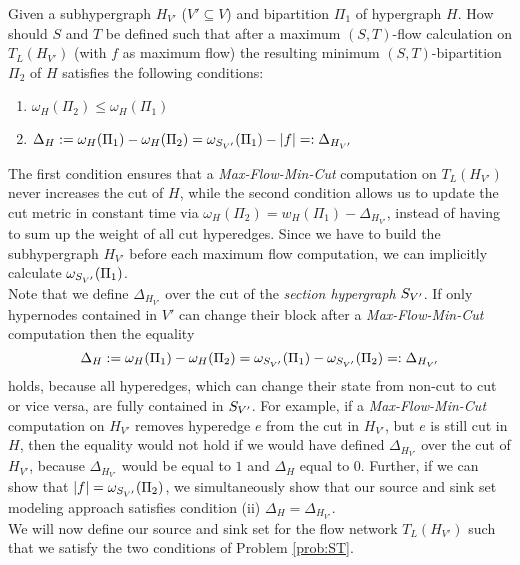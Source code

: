 \begin{problem}
\label{prob:ST} 
Given a subhypergraph $H_{V'}$ ($V' \subseteq V$) and bipartition $\Pi_1$ of hypergraph $H$.
How should $S$ and $T$ be defined such that after a maximum $(S,T)$-flow calculation on $T_L(H_{V'})$ (with 
$f$ as maximum flow) the resulting minimum $(S,T)$-bipartition $\Pi_2$ of $H$ satisfies
the following conditions:
\begin{enumerate}
\item $\omega_H(\Pi_2) \le \omega_H(\Pi_1)$
\item $\Delta_{H} := \omega_H(\Pi_1) - \omega_H(\Pi_2) = \omega_{S_{V'}}(\Pi_1) - |f| =: \Delta_{H_{V'}}$
\end{enumerate}
\end{problem}

The first condition ensures that a \emph{Max-Flow-Min-Cut} computation on $T_L(H_{V'})$ never 
increases the cut of $H$, while the second condition allows us to update the cut metric in
constant time via $\omega_H(\Pi_2) = w_H(\Pi_1) - \Delta_{H_{V'}}$, instead of having 
to sum up the weight of all cut hyperedges. Since we have to build the subhypergraph
$H_{V'}$ before each maximum flow computation, we can implicitly calculate $\omega_{S_{V'}}(\Pi_1)$.\\
Note that we define $\Delta_{H_{V'}}$ over the cut of the \emph{section hypergraph} $S_{V'}$.
If only hypernodes contained in $V'$ can change their block after a \emph{Max-Flow-Min-Cut} computation
then the equality
\[\Delta_{H} := \omega_H(\Pi_1) - \omega_H(\Pi_2) = \omega_{S_{V'}}(\Pi_1) - \omega_{S_{V'}}(\Pi_2) =: \Delta_{H_{V'}}\]
holds, because all hyperedges, which can change their state from non-cut to cut or vice versa, are
fully contained in $S_{V'}$. For example, if a \emph{Max-Flow-Min-Cut} computation
on $H_{V'}$ removes hyperedge $e$ from the cut in $H_{V'}$, but $e$ is still cut in
$H$, then the equality would not hold if we would have defined $\Delta_{H_{V'}}$ over the cut
of $H_{V'}$, because $\Delta_{H_{V'}}$ would be equal to $1$ and $\Delta_{H}$
equal to $0$. Further, if we can show that $|f| = \omega_{S_{V'}}(\Pi_2)$, 
we simultaneously show that our source and sink set modeling approach satisfies condition (ii) 
$\Delta_H = \Delta_{H_{V'}}$. \\
We will now define our source and sink set for the flow network $T_L(H_{V'})$ such that
we satisfy the two conditions of Problem \ref{prob:ST}.
